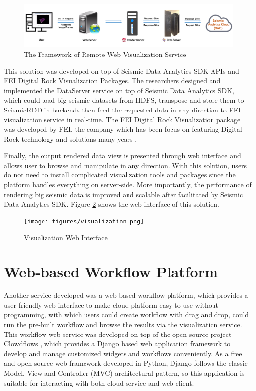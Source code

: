 \begin{figure}[h]
\centering
\includegraphics[scale=0.3]{figures/visualization_framework.png}
\caption{The Framework of Remote Web Visualization Service}
\label{visualization_framework}
\end{figure}

This solution was developed on top of Seismic Data Analytics SDK APIs and FEI Digital Rock Visualization Packages. The researchers designed and implemented the DataServer service on top of Seismic Data Analytics SDK, which could load big seismic datasets from HDFS, transpose and store them to SeismicRDD in backends then feed the requested data in any direction to FEI visualization service in real-time. The FEI Digital Rock Visualization package was developed by FEI, the company which has been focus on featuring Digital Rock technology and solutions many years \cite{FEICompany}. 

Finally, the output rendered data view is presented through web interface and allows user to browse and manipulate in any direction. With this solution, users do not need to install complicated visualization tools and packages since the platform handles everything on server-side. More importantly, the performance of rendering big seismic data is improved and scalable after facilitated by Seismic Data Analytics SDK. Figure \ref{visualization} shows the web interface of this solution.

\begin{figure}[h]
\centering
\texttt{[image: figures/visualization.png]}
\caption{Visualization Web Interface}
\label{visualization}
\end{figure}


\section{Web-based Workflow Platform}

Another service developed was a web-based workflow platform, which provides a user-friendly web interface to make cloud platform easy to use without programming, with which users could create workflow with drag and drop, could run the pre-built workflow and browse the results via the visualization service. This workflow web service was developed on top of the open-source project Clowdflows \cite{Clowdflows}, which provides a Django based web application framework to develop and manage customized widgets and workflows conveniently. As a free and open source web framework developed in Python, Django follows the classic Model, View and Controller (MVC) architectural pattern, so this application is suitable for interacting with both cloud service and web client.

